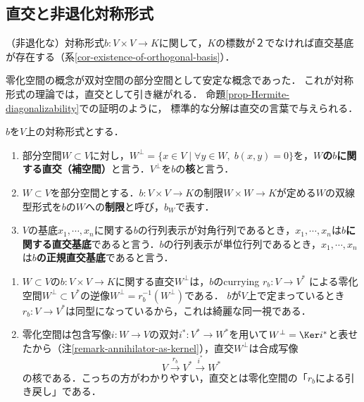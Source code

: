 \documentclass[uplatex, dvipdfmx]{jsreport}
\begin{document}
\subsection{直交と非退化対称形式}

\begin{tcolorbox}[colframe=ForestGreen, colback=ForestGreen!10!white, breakable]
    （非退化な）対称形式$b:V\times V\to K$に関して，$K$の標数が２でなければ直交基底が存在する（系\ref{cor-existence-of-orthogonal-basis}）．

    零化空間の概念が双対空間の部分空間として安定な概念であった．
    これが対称形式の理論では，直交として引き継がれる．
    命題\ref{prop-Hermite-diagonalizability}での証明のように，
    標準的な分解は直交の言葉で与えられる．
\end{tcolorbox}

\begin{definition}
    $b$を$V$上の対称形式とする．
    \begin{enumerate}
        \item 部分空間$W\subset V$に対し，$W^\perp = \{ x\in V\mid \forall y\in W,\;b(x,y)=0 \}$を，\textbf{$W$の$b$に関する直交（補空間）}と言う．$V^\perp$を$b$の\textbf{核}と言う．
        \item $W\subset V$を部分空間とする．$b:V\times V\to K$の制限$W\times W\to K$が定める$W$の双線型形式を$b$の$W$への\textbf{制限}と呼び，$b_W$で表す．
        \item $V$の基底$x_1,\cdots,x_n$に関する$b$の行列表示が対角行列であるとき，$x_1,\cdots,x_n$は\textbf{$b$に関する直交基底}であると言う．$b$の行列表示が単位行列であるとき，$x_1,\cdots,x_n$は\textbf{$b$の正規直交基底}であると言う．
    \end{enumerate}
\end{definition}
\begin{remark}\label{remark-orthogonal-as-kernel}\mbox{}
    \begin{enumerate}
        \item $W\subset V$の$b:V\times V\to K$に関する直交$W^\perp$は，$b$のcurrying $r_b:V\to V^*$
        による零化空間$W^\bot\subset V^*$の逆像$W^\perp=r_b^{-1}(W^\bot)$である．
        $b$が$V$上で定まっているとき$r_b:V\to V^*$は同型になっているから，これは綺麗な同一視である．
        \item 零化空間は包含写像$i:W\to V$の双対$i^*:V^*\to W^*$を用いて$W^\bot=\Ker i^*$と表せたから（注\ref{remark-annihilator-as-kernel}），直交$W^\perp$は合成写像
        \[V\xrightarrow{r_b}V^*\xrightarrow{i^*}W^*\]
        の核である．こっちの方がわかりやすい，直交とは零化空間の「$r_b$による引き戻し」である．
    \end{enumerate}
\end{remark}
\end{document}
